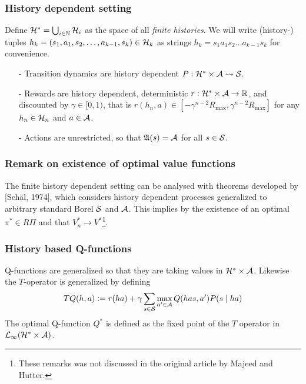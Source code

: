 \documentclass{beamer}[10]
\begin{document}
\begin{frame}
  \frametitle{History dependent setting}
  Define $\mathcal{H}^* = \bigcup_{i \in \mathbb{N}} \mathcal{H}_i$ as the space of all
  \emph{finite histories}.
  We will write (history-) tuples
  $h_k = (s_1, a_1, s_2, \dots, a_{k-1}, s_k) \in \mathcal{H}_k$
  as strings $h_k = s_1 a_1 s_2 \dots a_{k-1} s_k$ for convenience.
  \begin{itemize}
    \item[-] Transition dynamics are history dependent
      $P : \mathcal{H}^* \times \mathcal{A} \leadsto \mathcal{S}$.
    \item[-] Rewards are history dependent, deterministic
      $r : \mathcal{H}^* \times \mathcal{A} \to \mathbb{R}$,
      and discounted by $\gamma \in [0,1)$, that is 
      $r(h_n, a) \in [-\gamma^{n-2}R_{\max}, \gamma^{n-2} R_{\max}]$ for any
      $h_n \in \mathcal{H}_n$ and $a \in \mathcal{A}$.
    \item[-] Actions are unrestricted, so that
      $\frak{A}(s) = \mathcal{A}$ for all $s \in \mathcal{S}$.
  \end{itemize}
\end{frame}

\begin{frame}
  \frametitle{Remark on existence of optimal value functions}
  The finite history dependent setting
  can be analysed with theorems developed by [Schäl, 1974],
  which considers history dependent processes generalized to arbitrary
  standard Borel $\mathcal{S}$ and $\mathcal{A}$.
  This implies by the existence of an optimal
  $\pi^* \in R\Pi$ and that $V^*_n \to V^*$\footnote{These remarks was not
  discussed in the original article by Majeed and Hutter.}.
\end{frame}

\begin{frame}
  \frametitle{History based Q-functions}
  Q-functions are generalized so that
  they are taking values in $\mathcal{H}^* \times \mathcal{A}$.
  Likewise the $T$-operator is generalized by defining
  \begin{equation*}
    TQ(h, a) \vcentcolon= r(ha) +
    \gamma \sum_{s\in\mathcal{S}} \max_{a' \in \mathcal{A}} Q(has, a') P(s \mid ha)
  \end{equation*}
  The optimal Q-function $Q^*$ is defined as
  the fixed point of the $T$ operator in
  $\mathcal{L}_\infty(\mathcal{H}^* \times \mathcal{A})$.
\end{frame}
\end{document}
